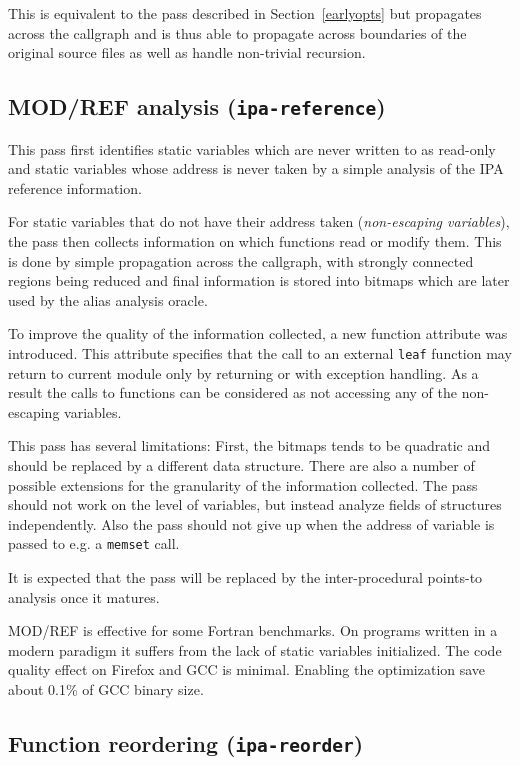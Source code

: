\documentclass[final]{ols}
\begin{document}
This is equivalent to the pass described in Section~\ref{earlyopts} but
propagates across the callgraph and is thus able to propagate across boundaries
of the original source files as well as handle non-trivial recursion.

\subsection{MOD/REF analysis ({\tt ipa-reference})}

This pass \cite{ipa-reference} first identifies static variables which are never written to as
read-only and static variables whose address is never taken by a simple
analysis of the IPA reference information.

For static variables that do not have their address taken ({\em non-escaping variables}),
the pass then collects information on which functions read or modify them.
This is done by simple propagation across the callgraph, with strongly connected
regions being reduced and final information is stored into bitmaps which are later used by
the alias analysis oracle.

To improve the quality of the information collected, a new function attribute 
was introduced.  This attribute specifies that the call to an external {\tt leaf} function may return
to current module only by returning or with exception handling. As a result the calls
to  functions can be considered as not accessing any
of the non-escaping variables.

This pass has several limitations: First, the bitmaps tends to be quadratic
and should be replaced by a different data structure. There are also
a number of possible extensions for the granularity of the information collected. The
pass should not work on the level of variables, but instead analyze fields of structures independently.
Also the pass should not give up when the address of variable is passed to e.g.
a {\tt memset} call.

It is expected that the pass will be replaced by the inter-procedural points-to
analysis once it matures.

MOD/REF is effective for some Fortran benchmarks. On programs written in a
modern paradigm it suffers from the lack of static variables initialized.  The
code quality effect on Firefox and GCC is minimal. Enabling the optimization
save about 0.1\% of GCC binary size.

\subsection{Function reordering ({\tt ipa-reorder})}
\label{ipa-reorder}
\end{document}
